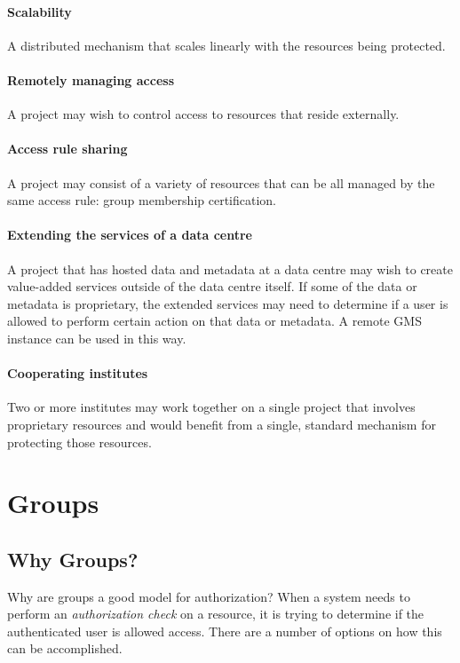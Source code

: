 \documentclass[11pt,a4paper]{ivoa}
\begin{document}
\paragraph{Scalability} A distributed mechanism that scales linearly with the resources being protected.

\paragraph{Remotely managing access} A project may wish to control access to resources that reside externally.

\paragraph{Access rule sharing} A project may consist of a variety of resources that can be all managed by the same access rule: group membership certification.

\paragraph{Extending the services of a data centre} A project that has hosted data and metadata at a data centre may wish to create value-added services outside of the data centre itself.  If some of the data or metadata is proprietary, the extended services may need to determine if a user is allowed to perform certain action on that data or metadata.  A remote GMS instance can be used in this way.

\paragraph{Cooperating institutes} Two or more institutes may work together on a single project that involves proprietary resources and would benefit from a single, standard mechanism for protecting those resources.

\section{Groups}

\subsection{Why Groups?}
\label{subsec:whygroups}

Why are groups a good model for authorization?  When a system needs to perform an \emph{authorization check} on a resource, it is trying to determine if the authenticated user is allowed access.  There are a number of options on how this can be accomplished.
\end{document}
